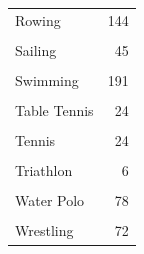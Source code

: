 \documentclass[
]{article}
\begin{document}
\begin{table}
\begin{tabular}[t]{lr}
Rowing & 144\\
\addlinespace
\cellcolor{gray!10}{Rugby Sevens} & \cellcolor{gray!10}{74}\\
Sailing & 45\\
\cellcolor{gray!10}{Shooting} & \cellcolor{gray!10}{45}\\
Swimming & 191\\
\cellcolor{gray!10}{Synchronized Swimming} & \cellcolor{gray!10}{32}\\
\addlinespace
Table Tennis & 24\\
\cellcolor{gray!10}{Taekwondo} & \cellcolor{gray!10}{32}\\
Tennis & 24\\
\cellcolor{gray!10}{Trampolining} & \cellcolor{gray!10}{6}\\
Triathlon & 6\\
\addlinespace
\cellcolor{gray!10}{Volleyball} & \cellcolor{gray!10}{72}\\
Water Polo & 78\\
\cellcolor{gray!10}{Weightlifting} & \cellcolor{gray!10}{45}\\
Wrestling & 72\\
\bottomrule
\end{tabular}
\end{table}
\newpage
\end{document}
